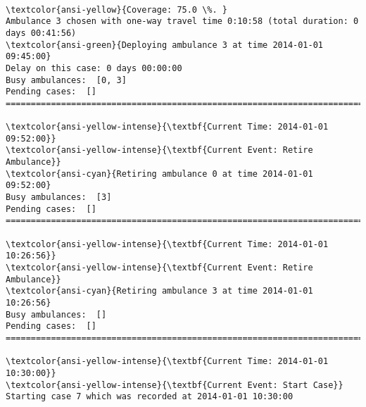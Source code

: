 \documentclass[11pt]{article}
\begin{document}
    \begin{center}
    \end{center}
    { \hspace*{\fill} \\}
    
    \begin{Verbatim}[commandchars=\\\{\}]
\textcolor{ansi-yellow}{Coverage: 75.0 \%. }
Ambulance 3 chosen with one-way travel time 0:10:58 (total duration: 0 days 00:41:56)
\textcolor{ansi-green}{Deploying ambulance 3 at time 2014-01-01 09:45:00}
Delay on this case: 0 days 00:00:00
Busy ambulances:  [0, 3]
Pending cases:  []
========================================================================

\textcolor{ansi-yellow-intense}{\textbf{Current Time: 2014-01-01 09:52:00}}
\textcolor{ansi-yellow-intense}{\textbf{Current Event: Retire Ambulance}}
\textcolor{ansi-cyan}{Retiring ambulance 0 at time 2014-01-01 09:52:00}
Busy ambulances:  [3]
Pending cases:  []
========================================================================

\textcolor{ansi-yellow-intense}{\textbf{Current Time: 2014-01-01 10:26:56}}
\textcolor{ansi-yellow-intense}{\textbf{Current Event: Retire Ambulance}}
\textcolor{ansi-cyan}{Retiring ambulance 3 at time 2014-01-01 10:26:56}
Busy ambulances:  []
Pending cases:  []
========================================================================

\textcolor{ansi-yellow-intense}{\textbf{Current Time: 2014-01-01 10:30:00}}
\textcolor{ansi-yellow-intense}{\textbf{Current Event: Start Case}}
Starting case 7 which was recorded at 2014-01-01 10:30:00

    \end{Verbatim}

    \begin{center}
    \end{center}
    { \hspace*{\fill} \\}
    
\end{document}
